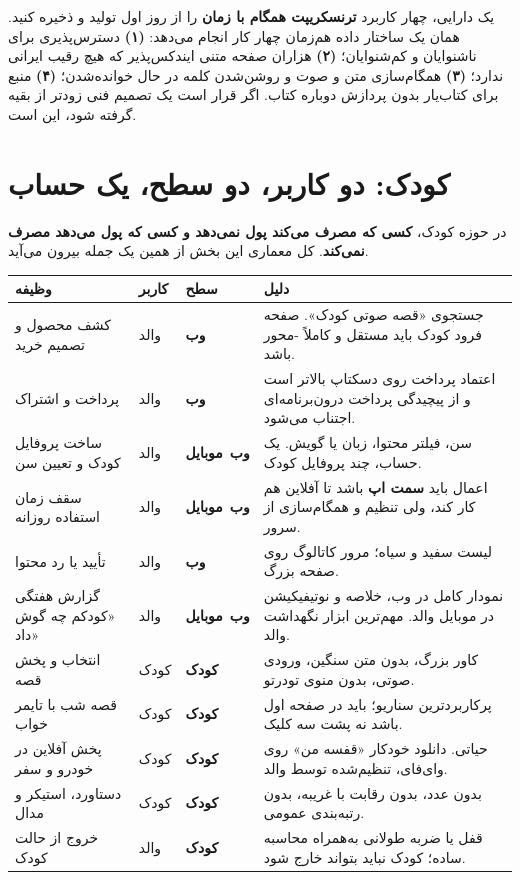 \documentclass[11pt,a4paper]{article}
\newcommand{\lt}[1]{{\latinfont\LRE{#1}}}
\newcommand{\tagbox}[2]{{\small\textcolor{#1}{\textbf{#2}}}}
\newcommand{\tweb}{\tagbox{web}{وب}}
\newcommand{\tmob}{\tagbox{mob}{موبایل}}
\newcommand{\tkid}{\tagbox{kid}{کودک}}
\begin{document}
\begin{notebox}{یک دارایی، چهار کاربرد}
\textbf{ترنسکریپت همگام با زمان} را از روز اول تولید و ذخیره کنید. همان یک ساختار داده
هم‌زمان چهار کار انجام می‌دهد:
\textbf{(۱)} دسترس‌پذیری برای ناشنوایان و کم‌شنوایان؛
\textbf{(۲)} هزاران صفحه متنی ایندکس‌پذیر که هیچ رقیب ایرانی ندارد؛
\textbf{(۳)} همگام‌سازی متن و صوت و روشن‌شدن کلمه در حال خوانده‌شدن؛
\textbf{(۴)} منبع \lt{context} برای کتاب‌یار بدون پردازش دوباره کتاب.
اگر قرار است یک تصمیم فنی زودتر از بقیه گرفته شود، این است.
\end{notebox}

\section{کودک: دو کاربر، دو سطح، یک حساب}
در حوزه کودک، \textbf{کسی که مصرف می‌کند پول نمی‌دهد و کسی که پول می‌دهد مصرف نمی‌کند}.
کل معماری این بخش از همین یک جمله بیرون می‌آید.

\begin{longtable}{@{}F{4.4cm} N{1.6cm} N{2.6cm} N{7.0cm}@{}}
\toprule
\textbf{وظیفه} & \textbf{کاربر} & \textbf{سطح} & \textbf{دلیل} \\
\midrule
\endhead
کشف محصول و تصمیم خرید & والد & \tweb & جستجوی «قصه صوتی کودک». صفحه فرود کودک باید مستقل و کاملاً \lt{SEO}-محور باشد. \\
پرداخت و اشتراک & والد & \tweb & اعتماد پرداخت روی دسکتاپ بالاتر است و از پیچیدگی پرداخت درون‌برنامه‌ای اجتناب می‌شود. \\
ساخت پروفایل کودک و تعیین سن & والد & \tweb\ \tmob & سن، فیلتر محتوا، زبان یا گویش. یک حساب، چند پروفایل کودک. \\
سقف زمان استفاده روزانه & والد & \tweb\ \tmob & اعمال باید \textbf{سمت اپ} باشد تا آفلاین هم کار کند، ولی تنظیم و همگام‌سازی از سرور. \\
تأیید یا رد محتوا & والد & \tweb & لیست سفید و سیاه؛ مرور کاتالوگ روی صفحه بزرگ. \\
گزارش هفتگی «کودکم چه گوش داد» & والد & \tweb\ \tmob & نمودار کامل در وب، خلاصه و نوتیفیکیشن در موبایل والد. مهم‌ترین ابزار نگهداشت والد. \\
انتخاب و پخش قصه & کودک & \tkid & کاور بزرگ، بدون متن سنگین، ورودی صوتی، بدون منوی تودرتو. \\
قصه شب با تایمر خواب & کودک & \tkid & پرکاربردترین سناریو؛ باید در صفحه اول باشد نه پشت سه کلیک. \\
پخش آفلاین در خودرو و سفر & کودک & \tkid & حیاتی. دانلود خودکار «قفسه من» روی وای‌فای، تنظیم‌شده توسط والد. \\
دستاورد، استیکر و مدال & کودک & \tkid & بدون عدد، بدون رقابت با غریبه، بدون رتبه‌بندی عمومی. \\
خروج از حالت کودک & والد & \tkid & قفل \lt{PIN} یا ضربه طولانی به‌همراه محاسبه ساده؛ کودک نباید بتواند خارج شود. \\
\bottomrule
\end{longtable}
\end{document}
